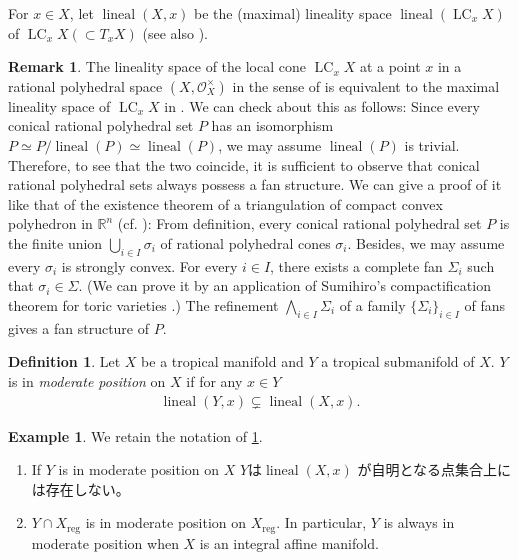 \documentclass[a4paper,dvipdfmx,reqno,12pt]{amsart}
\theoremstyle{definition}
\newtheorem{definition}[theorem]{Definition}
\newtheorem{example}[theorem]{Example}
\newtheorem{remark}[theorem]{Remark}
\newcommand{\opn}[1]{\operatorname{#1}}
\numberwithin{equation}{section}
\begin{document}
For $x\in X$, let 
$\opn{lineal}(X,x)$ be the (maximal) lineality space
$\opn{lineal}(\opn{LC}_x X)$ of 
$\opn{LC}_x X (\subset T_x X)$ \cite[]{MR4246795}
(see also \cite[]{demedrano2023chern}).



\begin{remark}
The lineality space of the local cone $\opn{LC}_x X$
at a point $x$ in a rational polyhedral space
$(X,\mathcal{O}_X^{\times})$ in the sense of 
\cite[]{MR4246795}
is equivalent to
the maximal lineality space of $\opn{LC}_x X$ in
\cite[]{MR3041763}.
We can check about this as follows:
Since every conical rational polyhedral set $P$ has an isomorphism
$P\simeq P/\opn{lineal}(P)\simeq \opn{lineal}(P)$, we
may assume $\opn{lineal}(P)$ is trivial.
Therefore, to see that the two coincide,
it is sufficient to observe that 
conical rational polyhedral sets
always possess a fan structure.
We can give a proof of it like
that of the existence theorem
of a triangulation of compact convex polyhedron
in $\mathbb{R}^{n}$ (cf. \cite[Theorem 2.11]{MR665919}):
From definition, every conical rational polyhedral set $P$
is the finite union $\bigcup_{i\in I}\sigma_i$ of 
rational polyhedral cones $\sigma_i$.
Besides, we may assume every $\sigma_i$ is strongly convex.
For every $i\in I$, there exists a
complete fan $\Sigma_i$ such that $\sigma_i\in\Sigma$.
(We can prove it by an application of Sumihiro's
compactification theorem for toric varieties
\cite[Theorem 3]{MR337963}.)
The refinement $\bigwedge_{i\in I}\Sigma_i$
of a family $\{\Sigma_i\}_{i\in I}$ of fans gives
a fan structure of $P$.
\end{remark}

\begin{definition}
\label{definition-permissible-position}
Let $X$ be a tropical manifold and $Y$ a
tropical submanifold of $X$.
$Y$ is in \emph{moderate position} on $X$ if
for any $x\in Y$
\begin{align}
     \opn{lineal}(Y,x) \subsetneq
 \opn{lineal}(X,x).
\end{align}
\end{definition}

\begin{example}
We retain the notation of 
\cref{definition-permissible-position}.
\begin{enumerate}
\item If $Y$ is in moderate position on $X$
$Y$は$\opn{lineal}(X,x)$
が自明となる点集合上には存在しない。
\item $Y\cap X_{\mathrm{reg}}$ is in 
moderate position on $X_{\mathrm{reg}}$.
In particular, $Y$ is always in moderate position
when $X$ is an integral affine manifold.
\end{enumerate}
\end{example}
\end{document}
